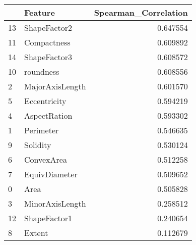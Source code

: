 \begin{tabular}{llr}
\toprule
 & Feature & Spearman_Correlation \\
\midrule
13 & ShapeFactor2 & 0.647554 \\
11 & Compactness & 0.609892 \\
14 & ShapeFactor3 & 0.608572 \\
10 & roundness & 0.608556 \\
2 & MajorAxisLength & 0.601570 \\
5 & Eccentricity & 0.594219 \\
4 & AspectRation & 0.593302 \\
1 & Perimeter & 0.546635 \\
9 & Solidity & 0.530124 \\
6 & ConvexArea & 0.512258 \\
7 & EquivDiameter & 0.509652 \\
0 & Area & 0.505828 \\
3 & MinorAxisLength & 0.258512 \\
12 & ShapeFactor1 & 0.240654 \\
8 & Extent & 0.112679 \\
\bottomrule
\end{tabular}
